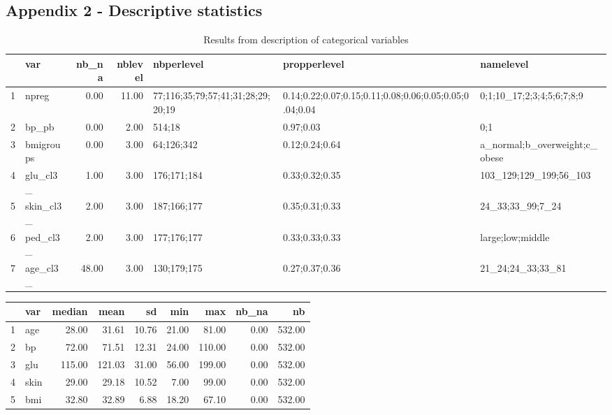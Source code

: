 \documentclass[12pt]{article}
\begin{document}
\begin{landscape}
\section*{Appendix 2 - Descriptive statistics}
\begin{table}[ht]
\centering
\begin{tabular}{rlrrlll}
  \hline
 & var & nb\_na & nblevel & nbperlevel & propperlevel & namelevel \\ 
  \hline
1 & npreg & 0.00 & 11.00 & 77;116;35;79;57;41;31;28;29;20;19 & 0.14;0.22;0.07;0.15;0.11;0.08;0.06;0.05;0.05;0.04;0.04 & 0;1;10\_17;2;3;4;5;6;7;8;9 \\ 
  2 & bp\_pb & 0.00 & 2.00 & 514;18 & 0.97;0.03 & 0;1 \\ 
  3 & bmigroups & 0.00 & 3.00 & 64;126;342 & 0.12;0.24;0.64 & a\_normal;b\_overweight;c\_obese \\ 
  4 & glu\_cl3\_ & 1.00 & 3.00 & 176;171;184 & 0.33;0.32;0.35 & 103\_129;129\_199;56\_103 \\ 
  5 & skin\_cl3\_ & 2.00 & 3.00 & 187;166;177 & 0.35;0.31;0.33 & 24\_33;33\_99;7\_24 \\ 
  6 & ped\_cl3\_ & 2.00 & 3.00 & 177;176;177 & 0.33;0.33;0.33 & large;low;middle \\ 
  7 & age\_cl3\_ & 48.00 & 3.00 & 130;179;175 & 0.27;0.37;0.36 & 21\_24;24\_33;33\_81 \\ 
   \hline
\end{tabular}
\caption{Results from description of categorical variables} 
\label{tab:descdisc}
\end{table}
\newpage
\begin{table}[ht]
\centering
\begin{tabular}{rlrrrrrrr}
  \hline
 & var & median & mean & sd & min & max & nb\_na & nb \\ 
  \hline
1 & age & 28.00 & 31.61 & 10.76 & 21.00 & 81.00 & 0.00 & 532.00 \\ 
  2 & bp & 72.00 & 71.51 & 12.31 & 24.00 & 110.00 & 0.00 & 532.00 \\ 
  3 & glu & 115.00 & 121.03 & 31.00 & 56.00 & 199.00 & 0.00 & 532.00 \\ 
  4 & skin & 29.00 & 29.18 & 10.52 & 7.00 & 99.00 & 0.00 & 532.00 \\ 
  5 & bmi & 32.80 & 32.89 & 6.88 & 18.20 & 67.10 & 0.00 & 532.00 \\ 

\end{tabular}
\end{table}
\end{landscape}
\end{document}
